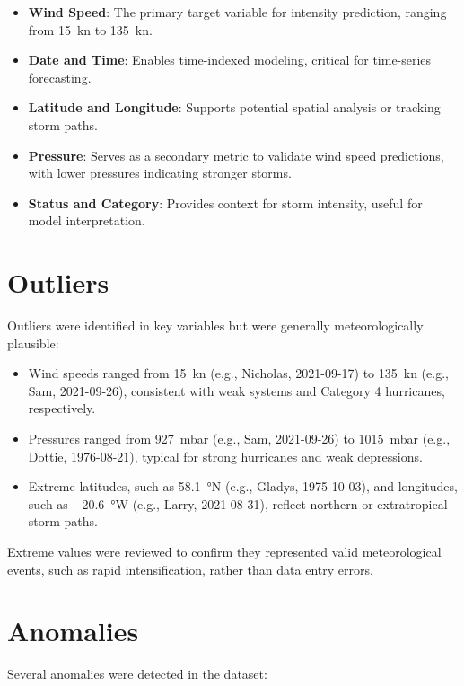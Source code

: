 \begin{itemize}
	\item \textbf{Wind Speed}: The primary target variable for intensity prediction, ranging from \SI{15}{\knot} to \SI{135}{\knot}.
	\item \textbf{Date and Time}: Enables time-indexed modeling, critical for time-series forecasting.
	\item \textbf{Latitude and Longitude}: Supports potential spatial analysis or tracking storm paths.
	\item \textbf{Pressure}: Serves as a secondary metric to validate wind speed predictions, with lower pressures indicating stronger storms.
	\item \textbf{Status and Category}: Provides context for storm intensity, useful for model interpretation.
\end{itemize}

\section{Outliers}
Outliers were identified in key variables but were generally meteorologically plausible:

\begin{itemize}
	\item Wind speeds ranged from \SI{15}{\knot} (e.g., Nicholas, 2021-09-17) to \SI{135}{\knot} (e.g., Sam, 2021-09-26), consistent with weak systems and Category 4 hurricanes, respectively.
	\item Pressures ranged from \SI{927}{\milli\bar} (e.g., Sam, 2021-09-26) to \SI{1015}{\milli\bar} (e.g., Dottie, 1976-08-21), typical for strong hurricanes and weak depressions.
	\item Extreme latitudes, such as \SI{58.1}{\degree}N (e.g., Gladys, 1975-10-03), and longitudes, such as \SI{-20.6}{\degree}W (e.g., Larry, 2021-08-31), reflect northern or extratropical storm paths.
\end{itemize}

Extreme values were reviewed to confirm they represented valid meteorological events, such as rapid intensification, rather than data entry errors.

\section{Anomalies}
Several anomalies were detected in the dataset:


